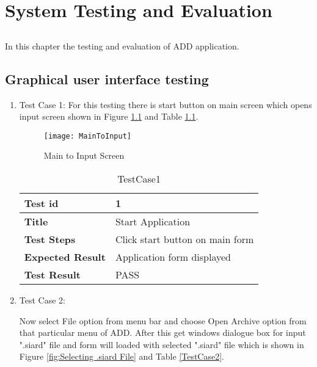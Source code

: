 \chapter{System Testing and Evaluation}\label{chap:testingEvaluation}


\section*{}In this chapter the testing and evaluation of ADD application.


 \section{Graphical user interface testing}
	\begin{enumerate}
		\item Test Case 1:
For this testing there is start button on main screen which opens input screen shown in Figure \ref{fig:Main to Input Screen} and Table \ref{TestCase1}.
\begin{figure}[ht]
\centering
\texttt{[image: MainToInput]}
\caption{Main to Input Screen}
\label{fig:Main to Input Screen}
\end{figure} 

\begin{table}[]
\centering
\begin{tabular}{|l|l|}
\hline
\bfseries Test id          & 1                 \\
\hline
\bfseries Title        & Start Application \\
\hline
\bfseries  Test Steps        & Click start button on main form           \\
\hline
\bfseries Expected Result & Application form displayed         \\
\hline
\bfseries Test Result & PASS \\
\hline                   
\end{tabular}
\caption{TestCase1}
\label{TestCase1}
\end{table}
\item Test Case 2:
\par Now select File option from menu bar and choose Open Archive option from that particular menu of ADD. After this get windows dialogue box for input ".siard" file and form will loaded with selected ".siard" file which is shown in Figure \ref{fig:Selecting .siard File} and Table \ref{TestCase2}.



\end{enumerate}
